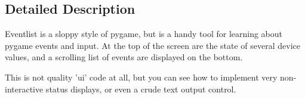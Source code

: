 \subsection{Detailed Description}
\begin{DoxyVerb}Eventlist is a sloppy style of pygame, but is a handy
tool for learning about pygame events and input. At the
top of the screen are the state of several device values,
and a scrolling list of events are displayed on the bottom.

This is not quality 'ui' code at all, but you can see how
to implement very non-interactive status displays, or even
a crude text output control.
\end{DoxyVerb}
 